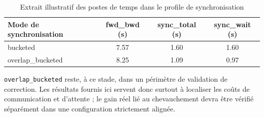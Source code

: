 \documentclass[a4paper,11pt,oneside]{article}
\begin{document}
\begin{table}[h]
\centering
\begin{tabular}{lccc}
\hline
Mode de synchronisation & fwd\_bwd (s) & sync\_total (s) & sync\_wait (s) \\
\hline
bucketed         & 7.57 & 1.60 & 1.60 \\
overlap\_bucketed & 8.25 & 1.09 & 0.97 \\
\hline
\end{tabular}
\caption{Extrait illustratif des postes de temps dans le profile de synchronisation}
\label{tab:mpi_profile}
\end{table}

\texttt{overlap\_bucketed} reste, à ce stade, dans un périmètre de validation de correction. Les résultats fournis ici servent donc surtout à localiser les coûts de communication et d'attente ; le gain réel lié au chevauchement devra être vérifié séparément dans une configuration strictement alignée.
\end{document}
